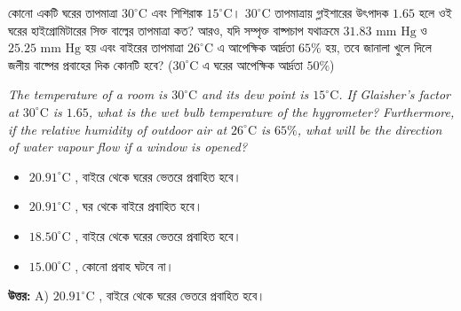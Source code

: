 \documentclass[12pt, a4paper]{article}
\begin{document}
\vspace{2em}

\begin{tcolorbox}[questionbox={প্রশ্ন (Question) 24}]
    \noindent
    কোনো একটি ঘরের তাপমাত্রা $30^\circ\text{C}$ এবং শিশিরাঙ্ক $15^\circ\text{C}$। $30^\circ\text{C}$ তাপমাত্রায় গ্লাইশারের উৎপাদক $1.65$ হলে ওই ঘরের হাইগ্রোমিটারের সিক্ত বাল্বের তাপমাত্রা কত? আরও, যদি সম্পৃক্ত বাষ্পচাপ যথাক্রমে $31.83\text{ mm Hg}$ ও $25.25\text{ mm Hg}$ হয় এবং বাইরের তাপমাত্রা $26^\circ\text{C}$ এ আপেক্ষিক আর্দ্রতা $65\%$ হয়, তবে জানালা খুলে দিলে জলীয় বাষ্পের প্রবাহের দিক কোনটি হবে? ($30^\circ\text{C}$ এ ঘরের আপেক্ষিক আর্দ্রতা $50\%$)
    
    \vspace{0.8em}
    \begin{english}
    \noindent\textit{\color{darkgray}
    The temperature of a room is $30^\circ\text{C}$ and its dew point is $15^\circ\text{C}$. If Glaisher's factor at $30^\circ\text{C}$ is $1.65$, what is the wet bulb temperature of the hygrometer? Furthermore, if the relative humidity of outdoor air at $26^\circ\text{C}$ is $65\%$, what will be the direction of water vapour flow if a window is opened?
    }
    \end{english}
\end{tcolorbox}

\begin{itemize}[label={}, leftmargin=1cm, itemsep=0.5em]
    \item[\textbf{A)}]  $20.91^\circ\text{C}$ , বাইরে থেকে ঘরের ভেতরে প্রবাহিত হবে।
    \item[\textbf{B)}]  $20.91^\circ\text{C}$ , ঘর থেকে বাইরে প্রবাহিত হবে।
    \item[\textbf{C)}]  $18.50^\circ\text{C}$ , বাইরে থেকে ঘরের ভেতরে প্রবাহিত হবে।
    \item[\textbf{D)}]  $15.00^\circ\text{C}$ , কোনো প্রবাহ ঘটবে না।
\end{itemize}

\vspace{0.5em}
\begin{tcolorbox}[answerbox]
    \textbf{\color{success} উত্তর:} A)  $20.91^\circ\text{C}$ , বাইরে থেকে ঘরের ভেতরে প্রবাহিত হবে।
\end{tcolorbox}
\vspace{1em}
\end{document}
